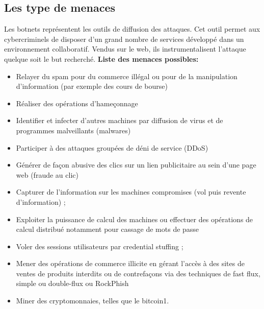 \subsection{Les type de menaces}
Les botnets représentent les outils de diffusion des attaques.
Cet outil permet aux cybercriminels de disposer d'un grand nombre de services développé dans un environnement collaboratif. Vendus sur le web, ils instrumentalisent l'attaque quelque soit le but recherché.
\newline \textbf{Liste des menaces possibles:}
\begin{itemize}
	\item Relayer du spam pour du commerce illégal ou pour de la manipulation d'information (par exemple des cours de bourse) 
  \item Réaliser des opérations d'hameçonnage 
  \item Identifier et infecter d’autres machines par diffusion de virus et de programmes malveillants (malwares) 
  \item Participer à des attaques groupées de déni de service (DDoS)
  \item Générer de façon abusive des clics sur un lien publicitaire au sein d’une page web (fraude au clic) 
  \item Capturer de l’information sur les machines compromises (vol puis revente d'information) ;
  \item Exploiter la puissance de calcul des machines ou effectuer des opérations de calcul distribué notamment pour cassage de mots de passe 
  \item Voler des sessions utilisateurs par credential stuffing ;
  \item Mener des opérations de commerce illicite en gérant l'accès à des sites de ventes de produits interdits ou de contrefaçons via des techniques de fast flux, simple ou double-flux ou RockPhish 
  \item Miner des cryptomonnaies, telles que le bitcoin1.
\end{itemize}